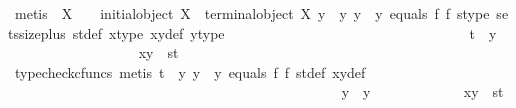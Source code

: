 \begin{isabellebody}
\ {\isacharparenleft}{\kern0pt}metis\ {\isacartoucheopen}{\isasymnot}\ X\ {\isasymcong}\ {\isasymOmega}{\isacartoucheclose}\ {\isacartoucheopen}{\isasymnot}\ initial{\isacharunderscore}{\kern0pt}object\ X{\isacartoucheclose}\ {\isacartoucheopen}{\isasymnot}\ terminal{\isacharunderscore}{\kern0pt}object\ X{\isacartoucheclose}\ {\isacartoucheopen}y\ {\isacharequal}{\kern0pt}\ y{}{\isacartoucheclose}\ {\isacartoucheopen}y\ {\isasymnoteq}\ y{}{\isacartoucheclose}\ equals\ f{}\ f{}\ s{\isacharunderscore}{\kern0pt}type\ sets{\isacharunderscore}{\kern0pt}size{\isacharunderscore}{\kern0pt}{}{\isacharunderscore}{\kern0pt}plus\ st{\isacharunderscore}{\kern0pt}def\ x{\isacharunderscore}{\kern0pt}type\ xy{\isacharunderscore}{\kern0pt}def\ y{}{\isacharunderscore}{\kern0pt}type{\isacharparenright}{\kern0pt}\isanewline
\ \ \ \ \ \ \ \ \ \ \ \ \ \ \ \isamarkupfalse%
\isanewline
\ \ \ \ \ \ \ \ \ \ \ \ \ \ \ \ \ \isamarkupfalse%
\ {\isachardoublequoteopen}t\ {\isasymnoteq}\ y{}{\isachardoublequoteclose}\isanewline
\ \ \ \ \ \ \ \ \ \ \ \ \ \ \ \ \ \isamarkupfalse%
\ {\isachardoublequoteopen}{\isasymlangle}x{\isacharcomma}{\kern0pt}y{\isasymrangle}\ {\isacharequal}{\kern0pt}\ {\isasymlangle}s{\isacharcomma}{\kern0pt}t{\isasymrangle}{\isachardoublequoteclose}\isanewline
\ \ \ \ \ \ \ \ \ \ \ \ \ \ \ \ \ \ \ \isamarkupfalse%
\ {\isacharparenleft}{\kern0pt}typecheck{\isacharunderscore}{\kern0pt}cfuncs{\isacharcomma}{\kern0pt}\ metis\ {\isacartoucheopen}t\ {\isasymnoteq}\ y{}{\isacartoucheclose}\ {\isacartoucheopen}y\ {\isasymnoteq}\ y{}{\isacartoucheclose}\ equals\ f{}\ f{}\ st{\isacharunderscore}{\kern0pt}def\ xy{\isacharunderscore}{\kern0pt}def{\isacharparenright}{\kern0pt}\isanewline
\ \ \ \ \ \ \ \ \ \ \ \ \ \ \ \isamarkupfalse%
\isanewline
\ \ \ \ \ \ \ \ \ \ \ \ \ \isamarkupfalse%
\isanewline
\ \ \ \ \ \ \ \ \ \ \ \isamarkupfalse%
\isanewline
\ \ \ \ \ \ \ \ \ \isamarkupfalse%
\isanewline
\ \ \ \ \ \ \ \ \ \ \ \isamarkupfalse%
\ {\isachardoublequoteopen}y\ {\isasymnoteq}\ y{}{\isachardoublequoteclose}\isanewline
\ \ \ \ \ \ \ \ \ \ \ \isamarkupfalse%
\ {\isachardoublequoteopen}{\isasymlangle}x{\isacharcomma}{\kern0pt}y{\isasymrangle}\ {\isacharequal}{\kern0pt}\ {\isasymlangle}s{\isacharcomma}{\kern0pt}t{\isasymrangle}{\isachardoublequoteclose}\isanewline
\ \ \ \ \ \ \ \ \ \ \ \isamarkupfalse%

\end{isabellebody}
